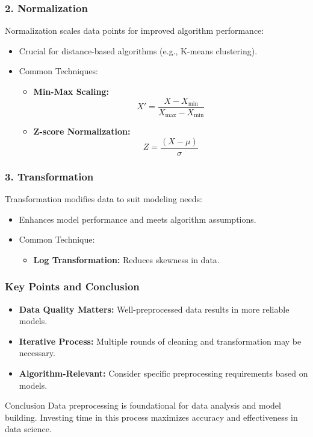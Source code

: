 \documentclass[aspectratio=169]{beamer}
\begin{document}
\begin{frame}[fragile]
    \frametitle{2. Normalization}
    Normalization scales data points for improved algorithm performance:
    \begin{itemize}
        \item Crucial for distance-based algorithms (e.g., K-means clustering).
        \item Common Techniques:
        \begin{itemize}
            \item \textbf{Min-Max Scaling:}
            \begin{equation}
                X' = \frac{X - X_{\min}}{X_{\max} - X_{\min}}
            \end{equation}
            \item \textbf{Z-score Normalization:}
            \begin{equation}
                Z = \frac{(X - \mu)}{\sigma}
            \end{equation}
        \end{itemize}
    \end{itemize}
\end{frame}

\begin{frame}[fragile]
    \frametitle{3. Transformation}
    Transformation modifies data to suit modeling needs:
    \begin{itemize}
        \item Enhances model performance and meets algorithm assumptions.
        \item Common Technique:
        \begin{itemize}
            \item \textbf{Log Transformation:} Reduces skewness in data.
        \end{itemize}
    \end{itemize}
\end{frame}

\begin{frame}[fragile]
    \frametitle{Key Points and Conclusion}
    \begin{itemize}
        \item \textbf{Data Quality Matters:} Well-preprocessed data results in more reliable models.
        \item \textbf{Iterative Process:} Multiple rounds of cleaning and transformation may be necessary.
        \item \textbf{Algorithm-Relevant:} Consider specific preprocessing requirements based on models.
    \end{itemize}
    \begin{block}{Conclusion}
        Data preprocessing is foundational for data analysis and model building. Investing time in this process maximizes accuracy and effectiveness in data science.
    \end{block}
\end{frame}
\end{document}
